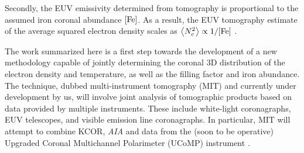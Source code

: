 \documentclass[baaa]{baaa}
\begin{document}
Secondly, the EUV {emissivity} determined from tomography is proportional to the assumed iron coronal abundance $[\rm{Fe}]$. As a result, the EUV tomography estimate of the average squared electron density scales as $\left<N_e^2\right> \propto 1/[\rm{Fe}]$ \citep{frazin_2009}.

The work summarized here is a first step towards the development of a new methodology capable of jointly determining the coronal 3D distribution of the electron density and temperature, as well as the filling factor and iron abundance. The technique, dubbed multi-instrument tomography (MIT) {and currently under development by us}, will involve joint analysis of tomographic products based on data provided by multiple instruments. These include white-light coronagraphs, EUV telescopes, and visible emission line coronagraphs. In particular, MIT will attempt to combine KCOR{, \textsl{AIA} and data from the} (soon to be operative) Upgraded Coronal Multichannel Polarimeter (UCoMP) instrument \citep{landi_2016}.


\small

 
\end{document}
